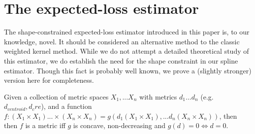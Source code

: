 \newpage



\section{The expected-loss estimator}
\label{supp_sec:el}
The shape-constrained expected-loss estimator introduced in this paper is, to our knowledge, novel.  It should be considered an alternative method to the classic weighted kernel method. While we do not attempt a detailed theoretical study of this estimator, we do establish the need for the shape constraint in our spline estimator. Though this fact is probably well known, we prove a (slightly stronger) version here for completeness.


Given a collection of metric spaces $X_1, ... X_n$ with metrics $d_1 ... d_n$ (e.g. $d_{centroid}, d_cre$), and a function $f: (X_1 \times X_1) ... \times (X_n  \times X_n) = g(d_1(X_1 \times X_1),... d_n(X_n \times X_n))$, then then $f$ is a metric iff $g$ is concave, non-decreasing and $g(d) = 0 \Longleftrightarrow d = 0$.

